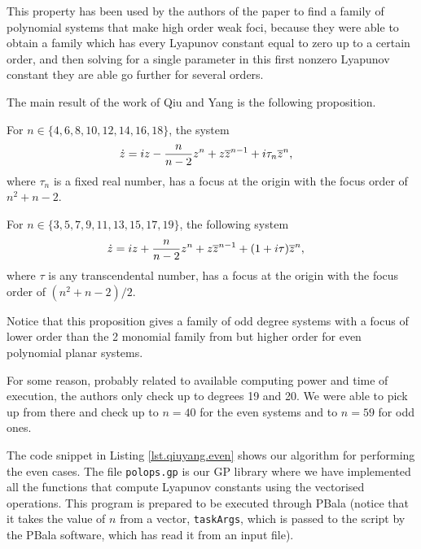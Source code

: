 This property has been used by the authors of the paper to find a family of polynomial systems that make high order weak foci, because they were able to obtain a family which has every Lyapunov constant equal to zero up to a certain order, and then solving for a single parameter in this first nonzero Lyapunov constant they are able go further for several orders.

The main result of the work of Qiu and Yang is the following proposition.
\begin{proposition}
\label{prop.qiuyang}
For $n\in\{4,6,8,10,12,14,16,18\}$, the system
\begin{align}
\dot z &= iz -\frac{n}{n-2}z^n+z\overline{z}^{n-1}+i\tau_n\overline{z}^n,
\end{align}
where $\tau_n$ is a fixed real number, has a focus at the origin with the focus order of $n^2+n-2$.

For $n\in\{3,5,7,9,11,13,15,17,19\}$, the following system
\begin{align}
\dot z &= iz + \frac{n}{n-2}z^n+z\overline{z}^{n-1}+(1+i \tau)\overline{z}^n,
\end{align}
where $\tau$ is any transcendental number, has a focus at the origin with the focus order of $(n^2+n-2)/2$.
\end{proposition}

\begin{observacio}
Notice that this proposition gives a family of odd degree systems with a focus of lower order than the 2 monomial family from \textcite{Gasull2016} but higher order for even polynomial planar systems.
\end{observacio}

For some reason, probably related to available computing power and time of execution, the authors only check up to degrees 19 and 20. We were able to pick up from there and check up to $n=40$ for the even systems and to $n=59$ for odd ones.

The code snippet in Listing \ref{lst.qiuyang.even} shows our algorithm for performing the even cases. The file \texttt{polops.gp} is our GP library where we have implemented all the functions that compute Lyapunov constants using the vectorised operations. This program is prepared to be executed through PBala (notice that it takes the value of $n$ from a vector, \texttt{taskArgs}, which is passed to the script by the PBala software, which has read it from an input file).



